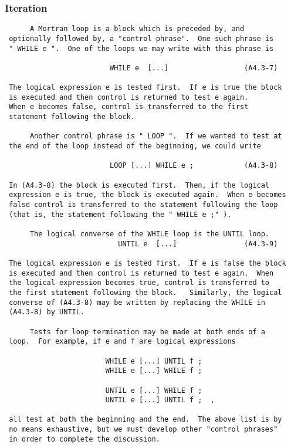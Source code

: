  \subsubsection{Iteration}
 \begin{verbatim}
      A Mortran loop is a block which is preceded by, and
 optionally followed by, a "control phrase".  One such phrase is
 " WHILE e ".  One of the loops we may write with this phrase is
 
                         WHILE e  [...]                  (A4.3-7)
 
 The logical expression e is tested first.  If e is true the block
 is executed and then control is returned to test e again.
 When e becomes false, control is transferred to the first
 statement following the block.
 
      Another control phrase is " LOOP ".  If we wanted to test at
 the end of the loop instead of the beginning, we could write
 
                         LOOP [...] WHILE e ;            (A4.3-8)
 
 In (A4.3-8) the block is executed first.  Then, if the logical
 expression e is true, the block is executed again.  When e becomes
 false control is transferred to the statement following the loop
 (that is, the statement following the " WHILE e ;" ).
 
      The logical converse of the WHILE loop is the UNTIL loop.
                           UNTIL e  [...]                (A4.3-9)
 
 The logical expression e is tested first.  If e is false the block
 is executed and then control is returned to test e again.  When
 the logical expression becomes true, control is transferred to
 the first statement following the block.   Similarly, the logical
 converse of (A4.3-8) may be written by replacing the WHILE in
 (A4.3-8) by UNTIL.
 
      Tests for loop termination may be made at both ends of a
 loop.  For example, if e and f are logical expressions
 
                        WHILE e [...] UNTIL f ;
                        WHILE e [...] WHILE f ;
 
                        UNTIL e [...] WHILE f ;
                        UNTIL e [...] UNTIL f ;  ,
 
 all test at both the beginning and the end.  The above list is by
 no means exhaustive, but we must develop other "control phrases"
 in order to complete the discussion.
 

\end{verbatim}
